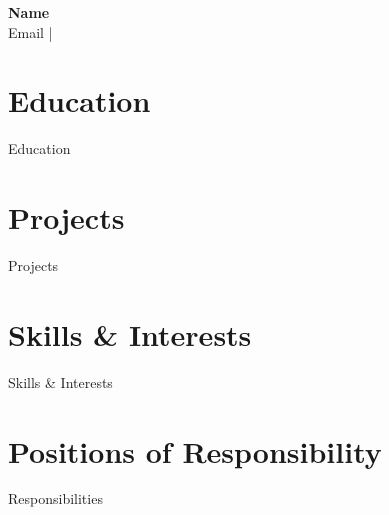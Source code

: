 \documentclass{article}
\begin{document}
\begin{center}
    {\LARGE \textbf{{{ Name }}}} \\
    \vspace{0.2cm}
    {{ Email }} \quad | 
\end{center}

\section*{Education}
{{ Education }}

\section*{Projects}
{{ Projects }}

\section*{Skills \& Interests}
{{ Skills & Interests }}

\section*{Positions of Responsibility}
{{ Responsibilities }}
\end{document}
